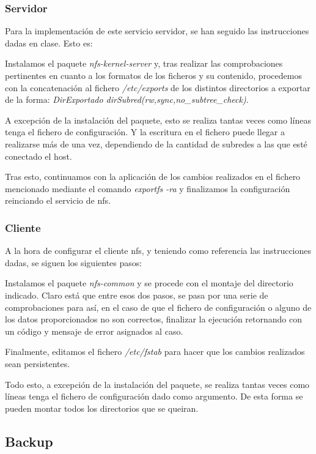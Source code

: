 \documentclass[12pt,a4paper, spanish]{article}
\begin{document}
\subsubsection{Servidor}
\noindent Para la implementación de este servicio servidor, se han seguido las instrucciones dadas en clase. Esto es:

Instalamos el paquete \textit{nfs-kernel-server} y, tras realizar las comprobaciones pertinentes en cuanto a los formatos de los ficheros y su contenido, procedemos con la concatenación al fichero \textit{/etc/exports} de los distintos directorios a exportar de la forma: \textit{DirExportado dirSubred(rw,sync,no\_subtree\_check)}.

A excepción de la instalación del paquete, esto se realiza tantas veces como líneas tenga el fichero de configuración. Y la escritura en el fichero puede llegar a realizarse más de una vez, dependiendo de la cantidad de subredes a las que esté conectado el host.

Tras esto, continuamos con la aplicación de los cambios realizados en el fichero mencionado mediante el comando \textit{exportfs -ra} y finalizamos la configuración reinciando el servicio de nfs.

\subsubsection{Cliente}
\noindent A la hora de configurar el cliente nfs, y teniendo como referencia las instrucciones dadas, se siguen los siguientes pasos:

Instalamos el paquete \textit{nfs-common} y se procede con el montaje del directorio indicado. Claro está que entre esos dos pasos, se pasa por una serie de comprobaciones para así, en el caso de que el fichero de configuración o alguno de los datos proporcionados no son correctos, finalizar la ejecución retornando con un código y mensaje de error asignados al caso.

Finalmente, editamos el fichero \textit{/etc/fstab} para hacer que los cambios realizados sean persistentes.

Todo esto, a excepción de la instalación del paquete, se realiza tantas veces como líneas tenga el fichero de configuración dado como argumento. De esta forma se pueden montar todos los directorios que se queiran.

\subsection{Backup}
\end{document}
